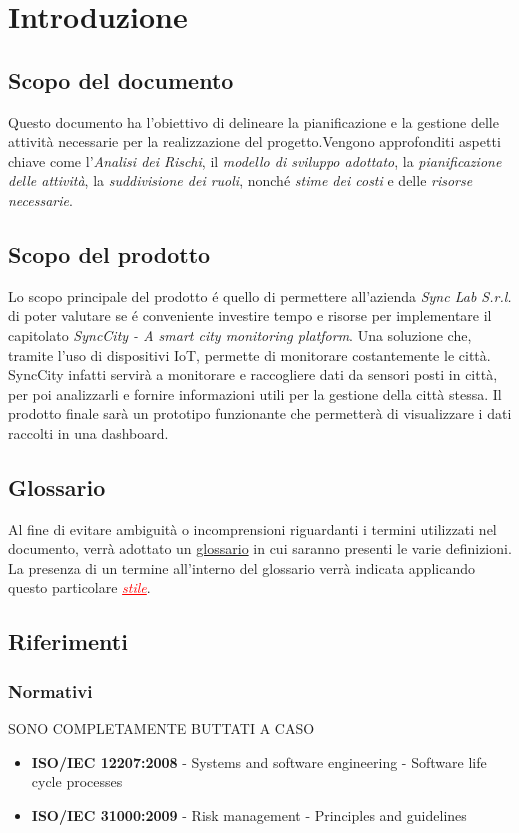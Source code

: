 \section{Introduzione}
\setcounter{subsection}{0}
\subsection{Scopo del documento}
Questo documento ha l’obiettivo di delineare la pianificazione e la gestione delle attività necessarie per la realizzazione del progetto.Vengono approfonditi aspetti chiave come l’\textit{Analisi dei Rischi}, il \textit{modello di sviluppo adottato}, la \textit{pianificazione delle attività}, la \textit{suddivisione dei ruoli}, nonché \textit{stime dei costi} e delle \textit{risorse necessarie}.

\subsection{Scopo del prodotto}
Lo scopo principale del prodotto é quello di permettere all’azienda \textit{Sync Lab S.r.l.} di poter valutare se é conveniente investire tempo e risorse per implementare il capitolato \textit{SyncCity - A smart city monitoring platform}. Una soluzione che, tramite l'uso di dispositivi IoT, permette di monitorare costantemente le città. SyncCity infatti servirà a monitorare e raccogliere dati da sensori posti in città, per poi analizzarli e fornire informazioni utili per la gestione della città stessa. Il prodotto finale sarà un prototipo funzionante che permetterà di visualizzare i dati raccolti in una dashboard.

\subsection{Glossario}
Al fine di evitare ambiguità o incomprensioni riguardanti i termini utilizzati nel documento, verrà adottato un \href{https://7last.github.io/docusaurus/docs/rtb/glossario#glossario-1}{glossario} in cui saranno presenti le varie definizioni. La presenza di un termine all'interno del glossario verrà indicata applicando questo particolare \textcolor{red}{\uline{\textit{stile}}}.
\subsection{Riferimenti}
    \subsubsection{Normativi}SONO COMPLETAMENTE BUTTATI A CASO
        \begin{itemize}
            \item \textbf{ISO/IEC 12207:2008} - Systems and software engineering - Software life cycle processes
            \item \textbf{ISO/IEC 31000:2009} - Risk management - Principles and guidelines
        \end{itemize}
